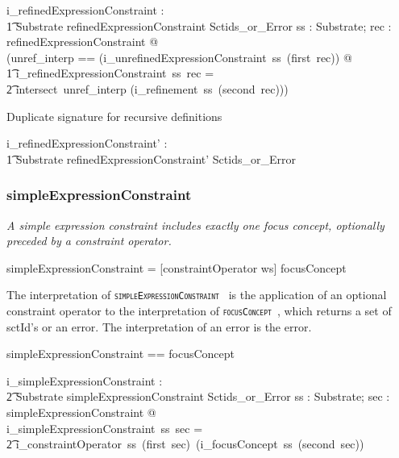 \documentclass{article}
\def\spec#1{{\tt \small \textsc{{#1}} }}
\def\bnf#1{{\scriptsize {{#1}} }}
\def\desc#1{{\small \textsl{{#1}} }}
\begin{document}
\begin{axdef}
   i\_refinedExpressionConstraint : \\
\t1 Substrate \fun refinedExpressionConstraint \fun Sctids\_or\_Error
\where
   \forall ss : Substrate; rec : refinedExpressionConstraint @ \\
  (\LET unref\_interp == (i\_unrefinedExpressionConstraint~ss~(first~rec)) @ \\
\t1   i\_refinedExpressionConstraint~ss~rec = \\
\t2 intersect~unref\_interp (i\_refinement~ss~(second~rec)))
\end{axdef}

Duplicate signature for recursive definitions
\begin{axdef}
   i\_refinedExpressionConstraint' : \\
\t1 Substrate \fun refinedExpressionConstraint' \fun Sctids\_or\_Error
\end{axdef}

\subsubsection{simpleExpressionConstraint}
\begin{framed}
\desc{A simple expression constraint includes exactly one focus concept, optionally preceded by a constraint operator.}
\end{framed}
\begin{framed}
\noindent
\bnf{simpleExpressionConstraint =  [constraintOperator ws] focusConcept} 
\end{framed}

The interpretation of  \spec{simpleExpressionConstraint} is the application of an optional constraint 
operator to the interpretation of \spec{focusConcept}, which returns a set of sctId's or an error.
The interpretation of an error is the error.

\begin{zed}
simpleExpressionConstraint == \optional[constraintOperator] \cross focusConcept \\
\end{zed} 

\begin{axdef}
   i\_simpleExpressionConstraint : \\
\t2 Substrate \fun simpleExpressionConstraint \fun Sctids\_or\_Error
\where
   \forall ss : Substrate; sec : simpleExpressionConstraint @ \\
i\_simpleExpressionConstraint~ss~sec =  \\
\t2 i\_constraintOperator~ss~(first~sec)~(i\_focusConcept~ss~(second~sec))
\end{axdef}
\end{document}
